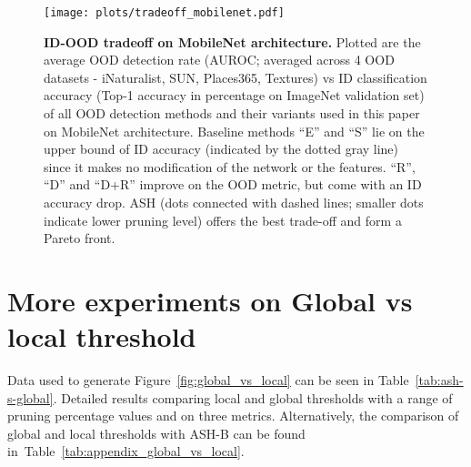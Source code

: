 \documentclass{article}
\newcommand{\figlabel}[1]{\label{fig:#1}}
\newcommand{\figref}[1]{Figure~\ref{fig:#1}}
\newcommand{\seclabel}[1]{\label{sec:#1}}
\newcommand{\tabref}[1]{Table~\ref{tab:#1}}
\begin{document}
\begin{figure}[hbt!]
    \centering 
	\texttt{[image: plots/tradeoff\_mobilenet.pdf]}
	\caption{\textbf{ID-OOD tradeoff on MobileNet architecture.} Plotted are the average OOD detection rate (AUROC; averaged across 4 OOD datasets - iNaturalist, SUN, Places365, Textures) vs ID classification accuracy (Top-1 accuracy in percentage on ImageNet validation set) of all OOD detection methods and their variants used in this paper on MobileNet architecture. Baseline methods ``E'' and ``S'' lie on the upper bound of ID accuracy (indicated by the dotted gray line) since it makes no modification of the network or the features. ``R'', ``D'' and ``D+R'' improve on the OOD metric, but come with an ID accuracy drop. ASH (dots connected with dashed lines; smaller dots indicate lower pruning level) offers the best trade-off and form a Pareto front.}
	\figlabel{tradeoff_mobilenet}
\end{figure}







\section{More experiments on Global vs local threshold}
\seclabel{ash-b-global}

Data used to generate \figref{global_vs_local} can be seen in \tabref{ash-s-global}. Detailed results comparing local and global thresholds with a range of pruning percentage values and on three metrics. 
Alternatively, the comparison of global and local thresholds with ASH-B can be found in~\tabref{appendix_global_vs_local}.
\end{document}
